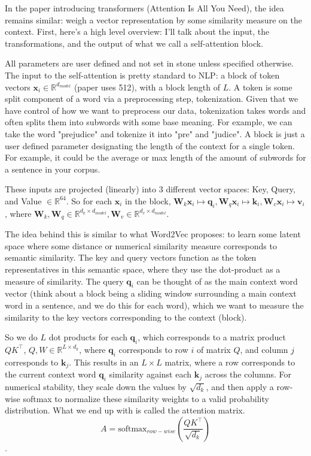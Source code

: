 \documentclass[11pt]{article}
\newcommand{\vk}{{\mathbf{k}}}
\newcommand{\vq}{{\mathbf{q}}}
\newcommand{\vv}{{\mathbf{v}}}
\newcommand{\vx}{{\mathbf{x}}}
\newcommand{\vW}{{\mathbf{W}}}
\newcommand{\trs}{{\top}}
\newcommand{\RR}{\mathbb{R}} %
\begin{document}
In the paper introducing transformers (Attention Is All You Need), the idea remains similar: weigh a vector representation by some similarity measure on the context. First, here's a high level overview: I'll talk about the input, the transformations, and the output of what we call a self-attention block. 

All parameters are user defined and not set in stone unless specified otherwise.
The input to the self-attention is pretty standard to NLP: a block of token vectors $\vx_i \in \RR^{d_{model}}$ (paper uses 512), with a block length of $L$. A token is some split component of a word via a preprocessing step, tokenization. Given that we have control of how we want to preprocess our data, tokenization takes words and often splits them into subwords with some base meaning. For example, we can take the word "prejudice" and tokenize it into "pre" and "judice". A block is just a user defined parameter designating the length of the context for a single token. For example, it could be the average or max length of the amount of subwords for a sentence in your corpus. 

These inputs are projected (linearly) into 3 different vector spaces: Key, Query, and Value $\in \RR^{64}$. So for each $\vx_i$ in the block, $\vW_k\vx_i \mapsto \vq_i, \vW_q\vx_i \mapsto \vk_i, \vW_v\vx_i \mapsto \vv_i$, where $\vW_k, \vW_q \in \RR^{d_k \times d_{model}}, \vW_v \in \RR^{d_v \times d_{model}}$. 

The idea behind this is similar to what Word2Vec proposes: to learn some latent space where some distance or numerical similarity measure corresponds to semantic similarity. The key and query vectors function as the token representatives in this semantic space, where they use the dot-product as a measure of similarity. The query $\vq_i$ can be thought of as the main context word vector (think about a block being a sliding window surrounding a main context word in a sentence, and we do this for each word), which we want to measure the similarity to the key vectors corresponding to the context (block). 

So we do $L$ dot products for each $\vq_i$, which corresponds to a matrix product $QK^\trs$, $Q,W \in \RR^{L\times d_k}$, where $\vq_i$ corresponds to row $i$ of matrix $Q$, and column $j$ corresponds to $\vk_j$. This results in an $L \times L$ matrix, where a row corresponds to the current context word $\vq_i$ similarity against each $\vk_j$ across the columns. For numerical stability, they scale down the values by $\sqrt{d_k}$, and then apply a row-wise softmax to normalize these similarity weights to a valid probability distribution. What we end up with is called the attention matrix. 
$$A = \mbox{softmax}_{row-wise}\left(\frac{QK^\trs}{\sqrt{d_k}}\right)$$.
\end{document}
